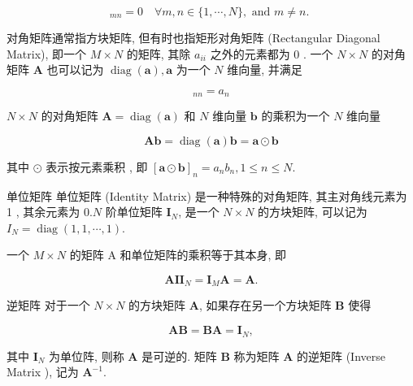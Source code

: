 \documentclass[10pt]{article}
\begin{document}
\begin{equation*}
[\boldsymbol{A}]_{m n}=0 \quad \forall m, n \in\{1, \cdots, N\}, \text { and } m \neq n \text {. } \tag{A.32}
\end{equation*}


对角矩阵通常指方块矩阵, 但有时也指矩形对角矩阵 (Rectangular Diagonal Matrix), 即一个 $M \times N$ 的矩阵, 其除 $a_{i i}$ 之外的元素都为 0 . 一个 $N \times N$ 的对角矩阵 $\boldsymbol{A}$ 也可以记为 $\operatorname{diag}(\boldsymbol{a}), \boldsymbol{a}$ 为一个 $N$ 维向量, 并满足


\begin{equation*}
[\boldsymbol{A}]_{n n}=a_{n} \tag{A.33}
\end{equation*}


$N \times N$ 的对角矩阵 $\boldsymbol{A}=\operatorname{diag}(\boldsymbol{a})$ 和 $N$ 维向量 $\boldsymbol{b}$ 的乘积为一个 $N$ 维向量


\begin{equation*}
\boldsymbol{A} \boldsymbol{b}=\operatorname{diag}(\boldsymbol{a}) \boldsymbol{b}=\boldsymbol{a} \odot \boldsymbol{b} \tag{A.34}
\end{equation*}


其中 $\odot$ 表示按元素乘积 , 即 $[\boldsymbol{a} \odot \boldsymbol{b}]_{n}=a_{n} b_{n}, 1 \leq n \leq N$.

单位矩阵 单位矩阵 (Identity Matrix) 是一种特殊的对角矩阵, 其主对角线元素为 1 , 其余元素为 $0 . N$ 阶单位矩阵 $\boldsymbol{I}_{N}$, 是一个 $N \times N$ 的方块矩阵, 可以记为 $I_{N}=\operatorname{diag}(1,1, \cdots, 1)$.

一个 $M \times N$ 的矩阵 $\mathrm{A}$ 和单位矩阵的乘积等于其本身, 即


\begin{equation*}
\boldsymbol{A I} \boldsymbol{I}_{N}=\boldsymbol{I}_{M} \boldsymbol{A}=\boldsymbol{A} . \tag{A.35}
\end{equation*}


逆矩阵 对于一个 $N \times N$ 的方块矩阵 $\boldsymbol{A}$, 如果存在另一个方块矩阵 $\boldsymbol{B}$ 使得


\begin{equation*}
\boldsymbol{A B}=\boldsymbol{B} \boldsymbol{A}=\boldsymbol{I}_{N}, \tag{A.36}
\end{equation*}


其中 $\boldsymbol{I}_{N}$ 为单位阵, 则称 $\boldsymbol{A}$ 是可逆的. 矩阵 $\boldsymbol{B}$ 称为矩阵 $\boldsymbol{A}$ 的逆矩阵 (Inverse Matrix ), 记为 $\boldsymbol{A}^{-1}$.
\end{document}
